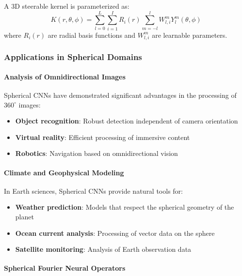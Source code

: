 \begin{definition}
A 3D steerable kernel is parameterized as:
\begin{equation}
K(r, \theta, \phi) = \sum_{l=0}^{L} \sum_{i=1}^{I} R_i(r) \sum_{m=-l}^{l} W_{l,i}^m Y_l^m(\theta, \phi)
\end{equation}
where $R_i(r)$ are radial basis functions and $W_{l,i}^m$ are learnable parameters.
\end{definition}

\subsubsection{Applications in Spherical Domains}

\paragraph{Analysis of Omnidirectional Images}

Spherical CNNs have demonstrated significant advantages in the processing of $360^\circ$ images:

\begin{itemize}
    \item \textbf{Object recognition}: Robust detection independent of camera orientation
    \item \textbf{Virtual reality}: Efficient processing of immersive content
    \item \textbf{Robotics}: Navigation based on omnidirectional vision
\end{itemize}

\paragraph{Climate and Geophysical Modeling}

In Earth sciences, Spherical CNNs provide natural tools for:

\begin{itemize}
    \item \textbf{Weather prediction}: Models that respect the spherical geometry of the planet
    \item \textbf{Ocean current analysis}: Processing of vector data on the sphere
    \item \textbf{Satellite monitoring}: Analysis of Earth observation data
\end{itemize}

\paragraph{Spherical Fourier Neural Operators}

